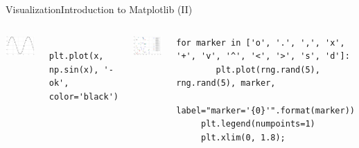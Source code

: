 \documentclass[10pt,compress]{beamer} %
\begin{document}
\begin{frame}[fragile]{Visualization}{Introduction to Matplotlib (II)}
	\begin{columns}
	\includegraphics[width=\textwidth]{figs/matplotlib-sin.png}\\

	\begin{exampleblock}{}
	\vspace{-0.2cm} 
	\begin{lstlisting}
	plt.plot(x, np.sin(x), '-ok', color='black')
	\end{lstlisting}
	\vspace{-0.2cm} 
	\end{exampleblock}

	\centering \includegraphics[width=\textwidth]{figs/matplotlib-scatterplot.png}\\
	\begin{exampleblock}{}
	\vspace{-0.2cm} 
	\begin{lstlisting}[basicstyle=\tiny]
	for marker in ['o', '.', ',', 'x', '+', 'v', '^', '<', '>', 's', 'd']:
	    plt.plot(rng.rand(5), rng.rand(5), marker,
	         label="marker='{0}'".format(marker))
	 plt.legend(numpoints=1)
	 plt.xlim(0, 1.8);
	\end{lstlisting}
	\vspace{-0.2cm} 
	\end{exampleblock}
	\end{columns}
\end{frame}
\end{document}
